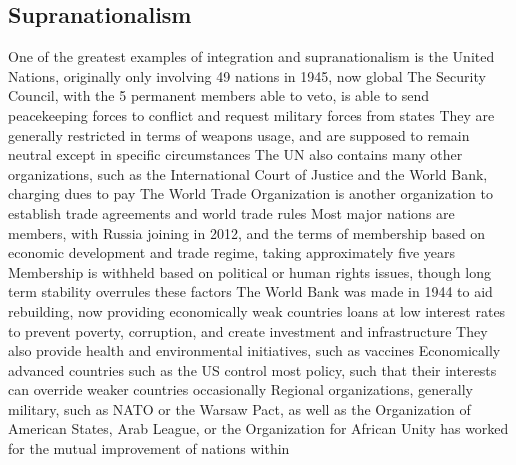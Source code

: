 \documentclass[11 pt, twoside]{article}
\newenvironment{outline*}
{
	\begin{outline}[enumerate]
	}
	{\end{outline}
}
\begin{document}
\subsection{Supranationalism}
\begin{outline*}
\1 One of the greatest examples of integration and supranationalism is the United Nations, originally only involving 49 nations in 1945, now global
\2 The Security Council, with the 5 permanent members able to veto, is able to send peacekeeping forces to conflict and request military forces from states
\2 They are generally restricted in terms of weapons usage, and are supposed to remain neutral except in specific circumstances
\2 The UN also contains many other organizations, such as the International Court of Justice and the World Bank, charging dues to pay
\1 The World Trade Organization is another organization to establish trade agreements and world trade rules
\2 Most major nations are members, with Russia joining in 2012, and the terms of membership based on economic development and trade regime, taking approximately five years
\2 Membership is withheld based on political or human rights issues, though long term stability overrules these factors
\1 The World Bank was made in 1944 to aid rebuilding, now providing economically weak countries loans at low interest rates to prevent poverty, corruption, and create investment and infrastructure
\2 They also provide health and environmental initiatives, such as vaccines
\2 Economically advanced countries such as the US control most policy, such that their interests can override weaker countries occasionally
\1 Regional organizations, generally military, such as NATO or the Warsaw Pact, as well as the Organization of American States, Arab League, or the Organization for African Unity has worked for the mutual improvement of nations within
\end{outline*}
\end{document}
